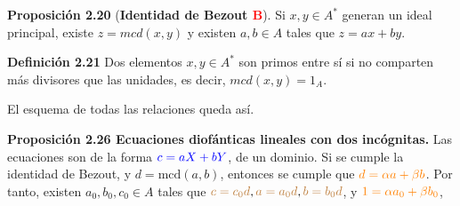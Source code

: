 \documentclass[a4paper, 11pt]{extarticle}
\newcommand{\propo}[1]{\textcolor{rojo}{\textbf{Proposición #1}}}
\newcommand{\defi}[1]{\textcolor{azul}{\textbf{Definición #1}}}
\begin{document}
\propo{2.20} (\textbf{Identidad de Bezout \textcolor{red}{B}}). Si \(x,y \in A^*\) 
generan un ideal principal, existe \(z = mcd(x,y)\) y existen \(a,b \in A\) 
tales que \(z = ax + by\).

\defi{2.21} Dos elementos \(x,y \in A^*\) son primos entre sí si no comparten
más divisores que las unidades, es decir, \(mcd(x,y) = 1_A\).

El esquema de todas las relaciones queda así.

\vspace{-1em}
\begin{center}
\end{center}
\vspace{-1em}
\vspace{-2em}
\propo{2.26 Ecuaciones diofánticas lineales con dos incógnitas.} Las ecuaciones 
son de la forma \(\textcolor{blue}{c = aX + bY}\), de un dominio. Si se cumple la identidad de 
Bezout, y \(d = \text{mcd}(a, b)\), entonces se cumple que \(\textcolor{orange}{ d = \alpha a +
\beta b }\). Por tanto, existen \(a_0, b_0, c_0 \in A\) tales que \(\textcolor{brown}{c = c_0d},
\textcolor{brown}{a = a_0d},\textcolor{brown}{ b = b_0d}\), y \(\textcolor{orange}{ 1 = \alpha a_0 + \beta b_0 }\),
\end{document}
